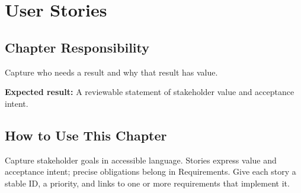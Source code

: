 \chapter{User Stories}
\section{Chapter Responsibility}
\label{Section:UserStoriesResponsibility}
Capture who needs a result and why that result has value.

\noindent\textbf{Expected result:} A reviewable statement of stakeholder value and acceptance intent.

\section{How to Use This Chapter}
Capture stakeholder goals in accessible language. Stories express value and
acceptance intent; precise obligations belong in Requirements. Give each story
a stable ID, a priority, and links to one or more requirements that implement it.

